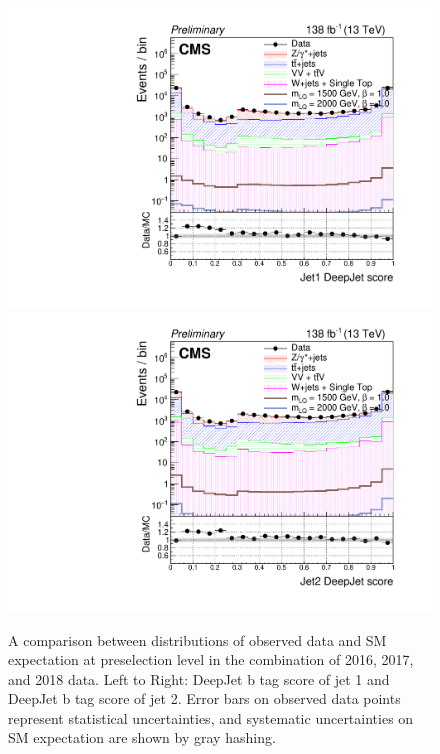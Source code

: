 \begin{figure}[H]
       \centering
       {\includegraphics[width=.49\textwidth]{Images/Analysis/Results_combined_Unblinded/Plots/Preselection/BasicLQ_uujj_DeepJet_jet1_standard.pdf}}
       {\includegraphics[width=.49\textwidth]{Images/Analysis/Results_combined_Unblinded/Plots/Preselection/BasicLQ_uujj_DeepJet_jet2_standard.pdf}}
       \caption{A comparison between distributions of observed data and SM expectation at preselection level in the combination of 2016, 2017, and 2018 data. Left to Right: DeepJet b tag score of jet 1 and DeepJet b tag score of jet 2. Error bars on observed data points represent statistical uncertainties, and systematic uncertainties on SM expectation are shown by gray hashing.}
    \label{fig:preselbtagCombined}
\end{figure}
